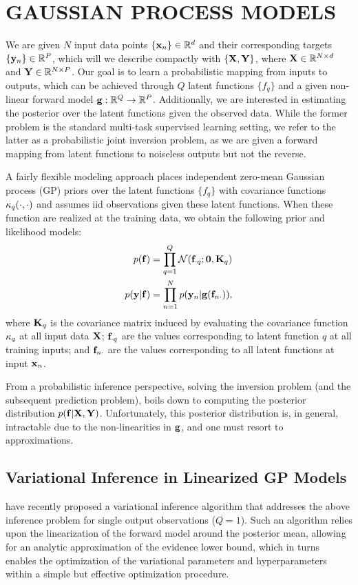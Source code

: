 \section{GAUSSIAN PROCESS MODELS}
We are given $N$ input data points $ \{ \mathbf{x}_n  \} \in \mathbb{R}^{d}$ and their corresponding  
targets $\{ \mathbf{y}_n  \} \in \mathbb{R}^{P}$, which will  we describe compactly with $\left\{{\mathbf{X}, \mathbf{Y}}\right\}$,
where $\mathbf{X} \in \mathbb{R}^{N \times d}$  and $\mathbf{Y} \in \mathbb{R}^{N \times P}$. Our goal is 
to learn a probabilistic mapping from inputs to outputs, which can be achieved through $Q$ latent  functions $\{ f_q \}$ and a given non-linear forward model $\mathbf{g} : \mathbb{R}^{Q} \to \mathbb{R}^{P}$. Additionally, we are interested in estimating the posterior over the latent functions given the observed data. 
While the former problem  is the standard multi-task supervised learning setting, we refer 
to the latter  as a probabilistic joint inversion problem, as we are given a forward mapping from 
latent functions to noiseless outputs but not the reverse. 

A fairly flexible modeling approach places independent zero-mean Gaussian process (GP) priors over 
the latent functions $\{ f_q \}$ with covariance functions $\kappa_q(\cdot, \cdot)$ and assumes iid observations given these latent functions. When these function are realized at the training data,
we obtain the following prior and likelihood models:
\begin{align}
	p(\mathbf{f})  &=  \prod_{q=1}^{Q} \mathcal{N}(\mathbf{f}_{\cdot q}; \mathbf{0}, \mathbf{K}_q) \\
	p(\mathbf{y} | \mathbf{f}) &= \prod_{n=1}^N p(\mathbf{y}_n | \mathbf{g} ( \mathbf{f}_{n \cdot} )) \text{,}
\end{align}
where $\mathbf{K}_q$ is the covariance matrix induced by evaluating  the covariance 
function $\kappa_q$ at all input data $\mathbf{X}$; $\mathbf{f}_{\cdot q}$ are  the values 
corresponding to latent function $q$ at all training inputs; 
and $\mathbf{f}_{n \cdot}$ are  the values corresponding to all latent functions at input $\mathbf{x}_n$. 

From a probabilistic inference perspective, solving the inversion problem (and the 
subsequent prediction problem), boils down to computing the posterior distribution 
$p(\mathbf{f} | \mathbf{X}, \mathbf{Y})$. Unfortunately, this posterior distribution is, in general, 
intractable due to the non-linearities in $\mathbf{g}$, and one must resort to approximations.
%
\subsection{Variational Inference in Linearized GP Models}
\citet{steinberg-bonilla-nips-2014} have recently proposed a variational inference algorithm that
addresses the above inference problem for single output observations ($Q=1$).  
Such an algorithm relies upon the linearization of the forward model around the posterior 
mean, allowing for an analytic approximation of the evidence lower bound, which in turns 
enables the optimization of the variational parameters and hyperparameters within a simple 
but effective optimization procedure.  

